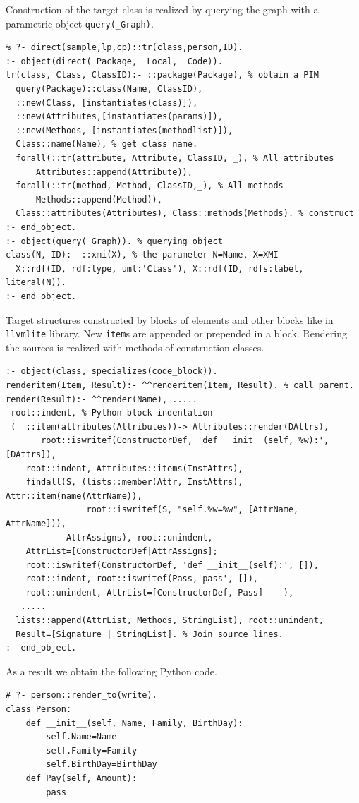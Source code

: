 \documentclass[runningheads]{llncs}
\begin{document}
Construction of the target class is realized by querying the graph with a parametric object \texttt{query(\_Graph)}.
\begin{verbatim}
% ?- direct(sample,lp,cp)::tr(class,person,ID).
:- object(direct(_Package, _Local, _Code)).
tr(class, Class, ClassID):- ::package(Package), % obtain a PIM
  query(Package)::class(Name, ClassID),
  ::new(Class, [instantiates(class)]),
  ::new(Attributes,[instantiates(params)]),
  ::new(Methods, [instantiates(methodlist)]),
  Class::name(Name), % get class name.
  forall(::tr(attribute, Attribute, ClassID, _), % All attributes
      Attributes::append(Attribute)),
  forall(::tr(method, Method, ClassID,_), % All methods
      Methods::append(Method)),
  Class::attributes(Attributes), Class::methods(Methods). % construct
:- end_object.
:- object(query(_Graph)). % querying object
class(N, ID):- ::xmi(X), % the parameter N=Name, X=XMI
  X::rdf(ID, rdf:type, uml:'Class'), X::rdf(ID, rdfs:label, literal(N)).
:- end_object.
\end{verbatim}

Target structures constructed by blocks of elements and other blocks like in \texttt{llvmlite} library.  New \texttt{item}s are appended or prepended in a block.  Rendering the sources is realized with methods of construction classes.

\begin{verbatim}
:- object(class, specializes(code_block)).
renderitem(Item, Result):- ^^renderitem(Item, Result). % call parent.
render(Result):- ^^render(Name), .....
 root::indent, % Python block indentation
 (  ::item(attributes(Attributes))-> Attributes::render(DAttrs),
       root::iswritef(ConstructorDef, 'def __init__(self, %w):',[DAttrs]),
    root::indent, Attributes::items(InstAttrs),
    findall(S, (lists::member(Attr, InstAttrs), Attr::item(name(AttrName)),
                root::iswritef(S, "self.%w=%w", [AttrName, AttrName])),
            AttrAssigns), root::unindent,
    AttrList=[ConstructorDef|AttrAssigns];
    root::iswritef(ConstructorDef, 'def __init__(self):', []),
    root::indent, root::iswritef(Pass,'pass', []),
    root::unindent, AttrList=[ConstructorDef, Pass]    ),
   .....
  lists::append(AttrList, Methods, StringList), root::unindent,
  Result=[Signature | StringList]. % Join source lines.
:- end_object.
\end{verbatim}

As a result we obtain the following Python code.
\begin{verbatim}
# ?- person::render_to(write).
class Person:
    def __init__(self, Name, Family, BirthDay):
        self.Name=Name
        self.Family=Family
        self.BirthDay=BirthDay
    def Pay(self, Amount):
        pass
\end{verbatim}
\end{document}
